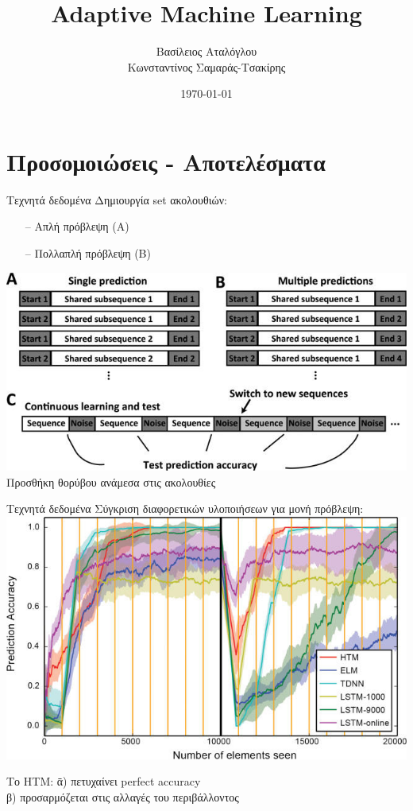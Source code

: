 \documentclass[11pt,center]{beamer}
\title{\huge{Adaptive Machine Learning}}
\author{Βασίλειος Αταλόγλου \\ Κωνσταντίνος Σαμαράς-Τσακίρης}
\date{\today}
\begin{document}
  \begin{frame}%
	  \titlepage
  \end{frame}



\section{Προσομοιώσεις - Αποτελέσματα}

	\begin{frame}{Τεχνητά δεδομένα}
		Δημιουργία set ακολουθιών:
		\begin{itemize}
			\item[--]Απλή πρόβλεψη (A)
			\item[--]Πολλαπλή πρόβλεψη (B)
		\end{itemize}
		\vfill
		\includegraphics[width=0.6 \textwidth,center]{../pics/sequences.jpg}
		\vfill
		\pause
		Προσθήκη θορύβου ανάμεσα στις ακολουθίες
	\end{frame}



	\begin{frame}{Τεχνητά δεδομένα}
		Σύγκριση διαφορετικών υλοποιήσεων για μονή πρόβλεψη:\\
		\vspace{1em}
		\includegraphics[width=0.7 \textwidth,center]{../pics/single_prediction.jpg}
		\pause
		\begin{tabbing}
  			Το HTM:  \=α) πετυχαίνει perfect accuracy\\
  			\>β) προσαρμόζεται στις αλλαγές του περιβάλλοντος\\
  		\end{tabbing}
	\end{frame}
\end{document}
